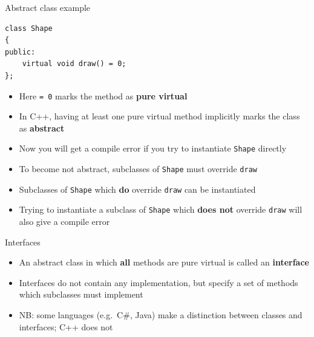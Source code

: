 \begin{frame}[fragile]{Abstract class example}
	\begin{lstlisting}
class Shape
{
public:
	virtual void draw() = 0;
};
	\end{lstlisting}
	\begin{itemize}
		\pause\item Here \lstinline{= 0} marks the method as \textbf{pure virtual}
		\pause\item In C++, having at least one pure virtual method implicitly marks the class as \textbf{abstract}
		\pause\item Now you will get a compile error if you try to instantiate \lstinline{Shape} directly
		\pause\item To become not abstract, subclasses of \lstinline{Shape} must override \lstinline{draw}
		\pause\item Subclasses of \lstinline{Shape} which \textbf{do} override \lstinline{draw} can be instantiated
		\pause\item Trying to instantiate a subclass of \lstinline{Shape} which \textbf{does not} override \lstinline{draw}
			will also give a compile error
	\end{itemize}
\end{frame}

\begin{frame}[fragile]{Interfaces}
	\begin{itemize}
		\pause\item An abstract class in which \textbf{all} methods are pure virtual is called an \textbf{interface}
		\pause\item Interfaces do not contain any implementation, but specify a set of methods which subclasses
			must implement
		\pause\item NB: some languages (e.g.\ C\#, Java) make a distinction between classes and interfaces;
			C++ does not
	\end{itemize}
\end{frame}

